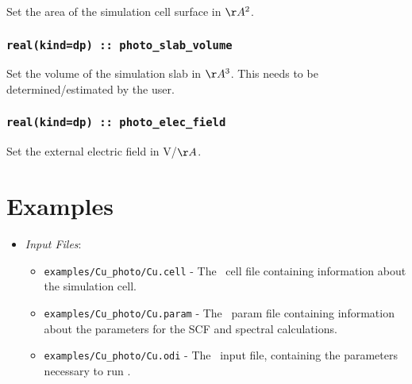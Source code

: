 \documentclass[a4paper,11pt,twoside]{book}
\begin{document}
Set the area of the simulation cell surface in $\AA^2$.

\subsection[photo\_slab\_volume]{\tt real(kind=dp) :: photo\_slab\_volume}

Set the volume of the simulation slab in $\AA^3$. This needs to be determined/estimated by the user.

\subsection[photo\_elec\_field]{\tt real(kind=dp) :: photo\_elec\_field}

Set the external electric field in V/$\AA$.

\chapter{Examples}

\begin{itemize}
This is an example of using photoemission module for calculating the photoemission properties of Cu(111) surface using a 16 atomic layers slab.
\item \emph{Input Files}:
\begin{itemize}
\item \verb#examples/Cu_photo/Cu.cell# - The \castep\ cell file containing information about the simulation cell.
\item \verb#examples/Cu_photo/Cu.param# - The \castep\ param file containing information about the parameters for the SCF and spectral calculations.
\item \verb#examples/Cu_photo/Cu.odi# - The \optados\ input file, containing the parameters necessary to run \optados.
\end{itemize}
\end{itemize}
\end{document}
